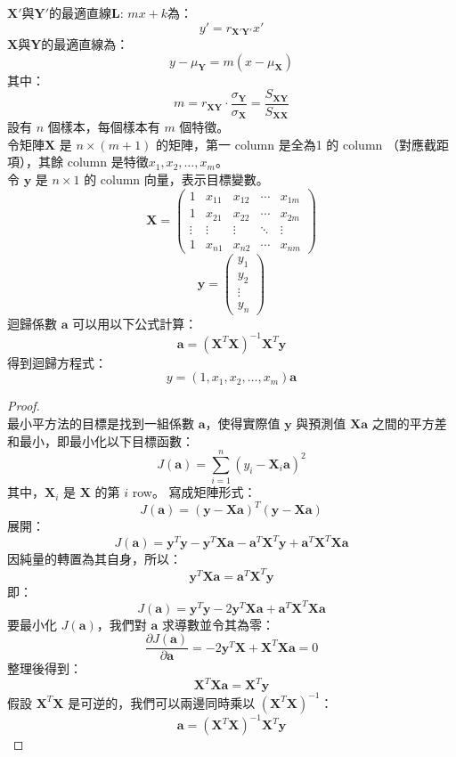 \documentclass[a4paper,12pt]{report}
\begin{document}
\(\mathbf{X}'\)與\(\mathbf{Y}'\)的最適直線$\mathbf{L}:\,mx+k$為：
\[y'=r_{\mathbf{X}'\mathbf{Y}'}x'\]
\(\mathbf{X}\)與\(\mathbf{Y}\)的最適直線為：
\[y-\mu_\mathbf{Y}=m(x-\mu_\mathbf{X})\]
其中：
\[m=r_{\mathbf{X}\mathbf{Y}}\cdot\frac{\sigma_\mathbf{Y}}{\sigma_\mathbf{X}}=\frac{S_{\mathbf{X}\mathbf{Y}}}{S_{\mathbf{X}\mathbf{X}}}\]
設有 \( n \) 個樣本，每個樣本有 \( m \) 個特徵。\\
令矩陣\(\mathbf{X}\) 是 \( n \times (m+1) \) 的矩陣，第一 column 是全為1 的 column （對應截距項），其餘 column 是特徵\( x_1, x_2,\ldots,x_m \)。\\
令 \(\mathbf{y}\) 是 \( n \times 1 \) 的 column 向量，表示目標變數。\\
\[
\mathbf{X} = \begin{pmatrix}
1 & x_{11} & x_{12} & \cdots & x_{1m} \\
1 & x_{21} & x_{22} & \cdots & x_{2m} \\
\vdots & \vdots & \vdots & \ddots & \vdots \\
1 & x_{n1} & x_{n2} & \cdots & x_{nm}
\end{pmatrix}
\]
\[
\mathbf{y} = \begin{pmatrix}
y_1 \\
y_2 \\
\vdots \\
y_n
\end{pmatrix}
\]
迴歸係數 \(\mathbf{a}\) 可以用以下公式計算：
\[
\mathbf{a} = (\mathbf{X}^T \mathbf{X})^{-1} \mathbf{X}^T \mathbf{y}
\]
得到迴歸方程式：
\[
y=(1,x_1, x_2,\ldots,x_m)\mathbf{a}
\]
\begin{proof}\mbox{}\\
最小平方法的目標是找到一組係數 \(\mathbf{a}\)，使得實際值 \(\mathbf{y}\) 與預測值 \(\mathbf{X}\mathbf{a}\) 之間的平方差和最小，即最小化以下目標函數：
\[
J(\mathbf{a}) = \sum_{i=1}^n (y_i - \mathbf{X}_i \mathbf{a})^2
\]
其中，\(\mathbf{X}_i\) 是 \(\mathbf{X}\) 的第 \(i\) row。
寫成矩陣形式：
\[
J(\mathbf{a}) = (\mathbf{y} - \mathbf{X}\mathbf{a})^T (\mathbf{y} - \mathbf{X}\mathbf{a})
\]
展開：
\[
J(\mathbf{a}) = \mathbf{y}^T\mathbf{y} - \mathbf{y}^T\mathbf{X}\mathbf{a} - \mathbf{a}^T\mathbf{X}^T\mathbf{y} + \mathbf{a}^T\mathbf{X}^T\mathbf{X}\mathbf{a}
\]
因純量的轉置為其自身，所以：
\[\mathbf{y}^T\mathbf{X}\mathbf{a}=\mathbf{a}^T\mathbf{X}^T\mathbf{y}\]
即：
\[
J(\mathbf{a}) = \mathbf{y}^T\mathbf{y} - 2\mathbf{y}^T\mathbf{X}\mathbf{a} + \mathbf{a}^T\mathbf{X}^T\mathbf{X}\mathbf{a}
\]
要最小化 \(J(\mathbf{a})\)，我們對 \(\mathbf{a}\) 求導數並令其為零：
\[
\frac{\partial J(\mathbf{a})}{\partial \mathbf{a}} = -2\mathbf{y}^T\mathbf{X} + \mathbf{X}^T \mathbf{X}\mathbf{a} = 0
\]
整理後得到：
\[
\mathbf{X}^T \mathbf{X} \mathbf{a} = \mathbf{X}^T \mathbf{y}
\]
假設 \(\mathbf{X}^T \mathbf{X}\) 是可逆的，我們可以兩邊同時乘以 \((\mathbf{X}^T \mathbf{X})^{-1}\)：
\[
\mathbf{a} = (\mathbf{X}^T \mathbf{X})^{-1} \mathbf{X}^T \mathbf{y}
\]
\end{proof}
\end{document}

